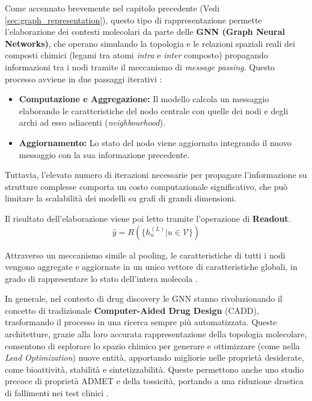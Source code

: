 Come accennato brevemente nel capitolo precedente (Vedi \ref{sec:graph_representation}), questo tipo di rappresentazione
permette l'elaborazione dei contesti molecolari da parte delle \textbf{GNN (Graph
Neural Networks)}, che operano simulando la topologia e le relazioni
spaziali reali dei composti chimici (legami tra atomi \textit{intra} e
\textit{inter} composto) propagando informazioni tra i nodi tramite il
meccanismo di \textit{message passing}. Questo processo avviene
in due passaggi iterativi \cite{wangGraphNeuralNetworks2023}:
\begin{itemize}
    \item \textbf{Computazione e Aggregazione:} Il modello calcola un
    messaggio elaborando le caratteristiche del nodo centrale con quelle
    dei nodi e degli archi ad esso adiacenti (\textit{neighbourhood}).
    \item \textbf{Aggiornamento:} Lo stato del nodo viene aggiornato
    integrando il nuovo messaggio con la sua informazione precedente.
\end{itemize}

Tuttavia, l'elevato numero di iterazioni necessarie per propagare l'informazione su strutture complesse comporta un costo computazionale significativo, che può limitare la scalabilità dei modelli su grafi di grandi dimensioni.

Il risultato dell'elaborazione viene poi letto tramite l'operazione di
\textbf{Readout}.
\begin{equation}
    \hat{y} = R(\{h_u^{(L)} | u \in \mathcal{V}\})
\end{equation}

Attraverso un meccanismo simile al pooling, le
caratteristiche di tutti i nodi vengono aggregate e aggiornate in un
unico vettore di caratteristiche globali, in grado di rappresentare lo
stato dell'intera molecola \cite{wangGraphNeuralNetworks2023}.

In generale, nel contesto di drug discovery le GNN stanno rivoluzionando
il concetto di tradizionale \textbf{Computer-Aided Drug Design} (CADD),
trasformando il processo in una ricerca sempre più automatizzata.
Queste architetture, grazie alla loro accurata rappresentazione della topologia molecolare, consentono di esplorare lo spazio chimico per generare
e ottimizzare (come nella \textit{Lead Optimization}) nuove entità, apportando migliorie nelle proprietà desiderate, come
bioattività, stabilità e sintetizzabilità.
Queste permettono anche uno studio precoce di proprietà ADMET e della tossicità,
portando a una riduzione drastica di fallimenti nei test clinici
\cite{wangGraphNeuralNetworks2025}.

